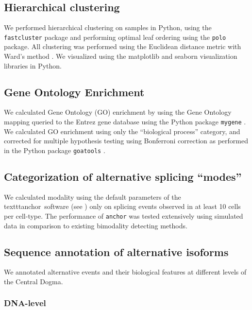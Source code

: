 \subsection{Hierarchical clustering}

We performed hierarchical clustering on samples in Python, using the \texttt{fastcluster} \cite{Mullner:2011ty} package and performing optimal leaf ordering \cite{BarJoseph:2001tr} using the \texttt{polo} \cite{Anonymous:2FB4UNR9} package. All clustering was performed using the Euclidean distance metric with Ward's method \cite{WardJr:2012te}. We visualized using the matplotlib \cite{Anonymous:matplotlib} and seaborn \cite{Anonymous:hWlQiCz3} visualization libraries in Python.

\subsection{Gene Ontology Enrichment}
We calculated Gene Ontology (GO) enrichment by using the Gene Ontology mapping queried to the Entrez gene database using the Python package \texttt{mygene} \cite{Wu:2012bo,Xin:2016fv}. We calculated GO enrichment using only the ``biological process'' category, and corrected for multiple hypothesis testing using Bonferroni correction as performed in the Python package \texttt{goatools} \cite{Tang:2015ub}.

\subsection{Categorization of alternative splicing ``modes''}
We calculated modality using the default parameters of the \\texttt{anchor}\, software (see ) only on splicing events observed in at least 10 cells per cell-type. The performance of \texttt{anchor} was tested extensively using simulated data in comparison to existing bimodality detecting methods.

\subsection{Sequence annotation of alternative isoforms}

We annotated alternative events and their biological features at different levels of the Central Dogma.

\subsubsection{DNA-level}

